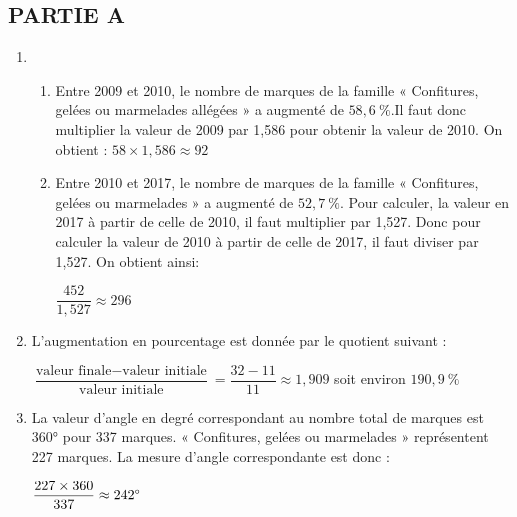 \subsection*{\hspace{20mm}\textbf{PARTIE A}}
\begin{enumerate}
    \item 
    \begin{enumerate}
        \item Entre 2009 et 2010, le nombre de marques de la famille « Confitures, gelées ou marmelades allégées » a augmenté de $58,6~\%$.Il faut donc multiplier la valeur de 2009 par 1,586 pour obtenir la valeur de 2010. On obtient : $58\times1,586\approx92$
        \item Entre 2010 et 2017, le nombre de marques de la famille « Confitures, gelées ou marmelades » a augmenté de $52,7~\%$. Pour calculer, la valeur en 2017 à partir de celle de 2010, il faut multiplier par 1,527. Donc pour calculer la valeur de 2010 à partir de celle de 2017, il faut diviser par 1,527. On obtient ainsi:
        
        \medskip
         $\dfrac{452}{1,527}\approx296$
        
    \end{enumerate}
    \item L'augmentation en pourcentage est donnée par le quotient suivant : 
    
    \medskip
    $\dfrac{\text{valeur finale} - \text{valeur initiale}}{\text{valeur initiale}}=\dfrac{32-11}{11}\approx 1,909$ soit environ $190,9~\%$
    \item La valeur d'angle en degré correspondant au nombre total de marques est 360° pour 337 marques. « Confitures, gelées ou marmelades » représentent 227 marques. La mesure d'angle correspondante est donc :
    
    \medskip
    $\dfrac{227\times360}{337}\approx242\degree$
\end{enumerate}

